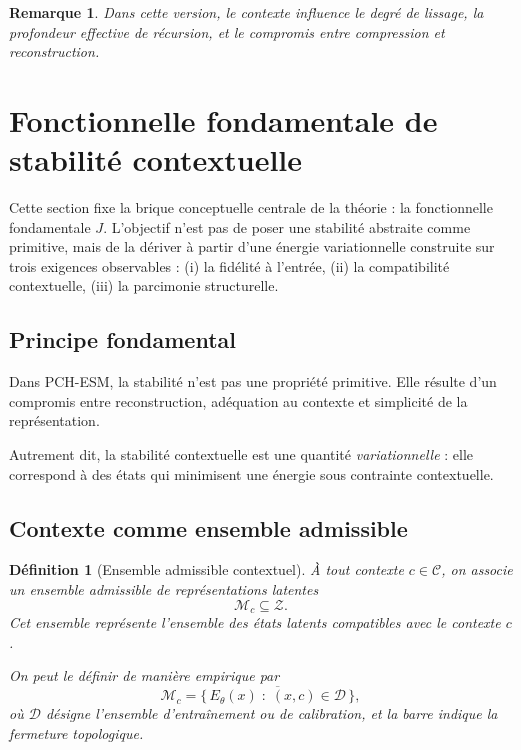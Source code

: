 \documentclass[11pt,a4paper]{article}
\newtheorem{definition}{Définition}[section]
\newtheorem{remark}{Remarque}[section]
\newcommand{\C}{\mathcal C}
\newcommand{\Z}{\mathcal Z}
\newcommand{\1}{\mathbf 1}
\begin{document}
\begin{remark}
Dans cette version, le contexte influence le degré de lissage, la profondeur effective de récursion, et le compromis entre compression et reconstruction.
\end{remark}

\section{Fonctionnelle fondamentale de stabilité contextuelle}

Cette section fixe la brique conceptuelle centrale de la théorie : la fonctionnelle fondamentale \(J\).
L'objectif n'est pas de poser une stabilité abstraite comme primitive, mais de la dériver à partir
d'une énergie variationnelle construite sur trois exigences observables :
(i) la fidélité à l'entrée,
(ii) la compatibilité contextuelle,
(iii) la parcimonie structurelle.

\subsection{Principe fondamental}

Dans PCH-ESM, la stabilité n'est pas une propriété primitive.
Elle résulte d'un compromis entre reconstruction, adéquation au contexte et simplicité de la représentation.

Autrement dit, la stabilité contextuelle est une quantité \emph{variationnelle} :
elle correspond à des états qui minimisent une énergie sous contrainte contextuelle.

\subsection{Contexte comme ensemble admissible}

\begin{definition}[Ensemble admissible contextuel]
À tout contexte \(c\in\C\), on associe un ensemble admissible de représentations latentes
\[
\mathcal M_c \subseteq \Z.
\]
Cet ensemble représente l'ensemble des états latents compatibles avec le contexte \(c\).

On peut le définir de manière empirique par
\[
\mathcal M_c
=
\overline{
\{\,E_\theta(x)\;:\;(x,c)\in\mathcal D\,\}
},
\]
où \(\mathcal D\) désigne l'ensemble d'entraînement ou de calibration, et la barre indique la fermeture topologique.
\end{definition}
\end{document}
